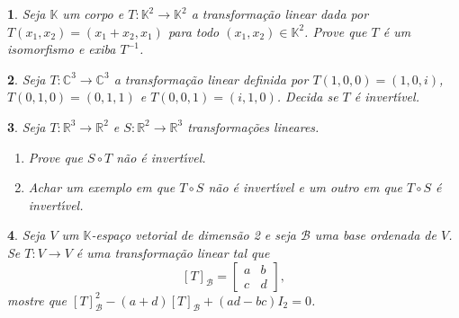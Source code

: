 \documentclass[12pt]{exam}
\newtheorem{exercicio}{}
\newcommand{\real}{\mathbb{R}}
\newcommand{\complex}{\mathbb{C}}
\newcommand{\cp}[1]{\mathbb{#1}}
\begin{document}
\begin{exercicio}
  Seja $\cp{K}$ um corpo e $T : \cp{K}^2 \to \cp{K}^2$ a transforma\c{c}\~ao linear dada por $T(x_1,x_2) = (x_1 + x_2, x_1)$ para todo $(x_1,x_2) \in \cp{K}^2$. Prove que $T$ \'e um isomorfismo e exiba $T^{-1}$.
\end{exercicio}

\begin{exercicio}
  Seja $T : \complex^3 \to \complex^3$ a transforma\c{c}\~ao linear definida por $T(1,0,0) = (1,0,i)$, $T(0,1,0) = (0,1,1)$ e $T(0,0,1) = (i,1,0)$. Decida se $T$ \'e invert{\'\i}vel.
\end{exercicio}

\begin{exercicio}
  Seja $T : \real^3 \to \real^2$ e $S : \real^2 \to \real^3$ transforma\c{c}\~oes lineares.
  \begin{enumerate}[label=({\alph*})]
    \item Prove que $S \circ T$ n\~ao \'e invert{\'\i}vel.
    \item Achar um exemplo em que $T\circ S$ n\~ao \'e invert{\'\i}vel e um outro em que $T\circ S$ \'e invert{\'\i}vel.
  \end{enumerate}
\end{exercicio}

\begin{exercicio}
  Seja $V$ um $\cp{K}$-espa\c{c}o vetorial de dimens\~ao 2 e seja $\mathcal{B}$ uma base ordenada de $V$. Se $T: V \to V$ \'e uma transforma\c{c}\~ao linear tal que
  \[
    [T]_\mathcal{B} = \begin{bmatrix}
      a & b\\
      c & d
    \end{bmatrix},
  \]
  mostre que $[T]_\mathcal{B}^2 - (a + d)[T]_\mathcal{B} + (ad - bc)I_2 = 0$.
\end{exercicio}
\end{document}
